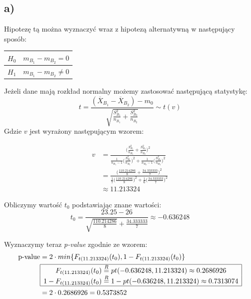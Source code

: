 \documentclass{article}
\begin{document}
\subsection{a)}
Hipotezę tą można wyznaczyć wraz z hipotezą alternatywną w następujący sposób:
\begin{center} \begin{tabular}{|c|c|} \hline
$H_0$ & $m_{B_1} - m_{B_2} = 0$ \\ \hline
$H_1$ & $m_{B_1} - m_{B_2} \neq 0$ \\ \hline
\end{tabular} \end{center}

Jeżeli dane mają rozkład normalny możemy zastosować następującą statystykę:
\[ t = \frac{(\overline{X}_{B_1} - \overline{X}_{B_2}) - m_0}{\sqrt{ \frac{S_{B_1}^2}{n_{B_1}} + \frac{S_{B_2}^2}{n_{B_2}} }} \sim t(v) \]
Gdzie $v$ jest wyrażony następującym wzorem:

\begin{align*}
v & = \frac{ \Big( \frac{S_{B_1}^2}{n_{B_1}} + \frac{S_{B_2}^2}{n_{B_2}} \Big)^2 }{\frac{1}{n_{B_1}-1} \Big( \frac{S_{B_1}^2}{n_{B_1}} \Big)^2 + \frac{1}{n_{B_2}-1} \Big( \frac{S_{B_2}^2}{n_{B_2}} \Big)^2 } \\
& = \frac{ \Big( \frac{110.214286}{8} + \frac{34.333333}{7} \Big)^2 }{\frac{1}{7} \Big( \frac{110.214286}{8} \Big)^2 + \frac{1}{6} \Big( \frac{34.333333}{7} \Big)^2 } \\
& \approx 11.213324
\end{align*}

Obliczymy wartość $t_0$ podstawiając znane wartości:
\[ t_0 = \frac{23.25 - 26}{\sqrt{ \frac{110.214286}{8}} + \frac{34.333333}{7}}  \approx -0.636248 \]

Wyznaczymy teraz \textit{p-value} zgodnie ze wzorem:
\begin{align*}
\text{p-value} & = 2 \cdot min\{ F_{t(11.213324)}(t_0), 1 - F_{t(11.213324)}(t_0) \} \\
& \begin{array}{|c|}
\hline
F_{t(11.213324)}(t_0)  \overset{R}{=} pt(-0.636248, 11.213324) \approx 0.2686926 \\
1 - F_{t(11.213324)}(t_0) \overset{R}{=} 1 -  pt(-0.636248, 11.213324) \approx  0.7313074\\ \hline
\end{array} \\
& = 2 \cdot 0.2686926 = 0.5373852
\end{align*}
\end{document}
